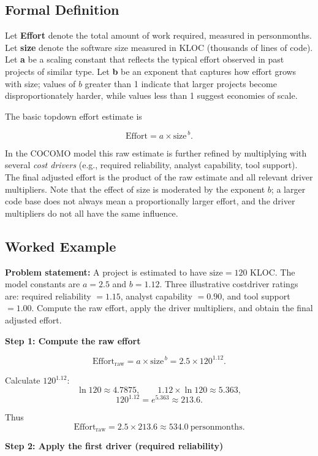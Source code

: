 \documentclass[12pt, a4paper]{article}
\begin{document}
\subsection{Formal Definition}
Let \textbf{Effort} denote the total amount of work required, measured in personmonths.  
Let \textbf{size} denote the software size measured in KLOC (thousands of lines of code).  
Let \textbf{a} be a scaling constant that reflects the typical effort observed in past projects of similar type.  
Let \textbf{b} be an exponent that captures how effort grows with size; values of \(b\) greater than 1 indicate that larger projects become disproportionately harder, while values less than 1 suggest economies of scale.

The basic topdown effort estimate is  

\[
\text{Effort} = a \times \text{size}^{\,b}.
\]

In the COCOMO model this raw estimate is further refined by multiplying with several \emph{cost drivers} (e.g., required reliability, analyst capability, tool support).  The final adjusted effort is the product of the raw estimate and all relevant driver multipliers.  Note that the effect of size is moderated by the exponent \(b\); a larger code base does not always mean a proportionally larger effort, and the driver multipliers do not all have the same influence.

\subsection{Worked Example}
\textbf{Problem statement:}  
A project is estimated to have \(\text{size}=120\) KLOC.  The model constants are \(a=2.5\) and \(b=1.12\).  Three illustrative costdriver ratings are: required reliability \(=1.15\), analyst capability \(=0.90\), and tool support \(=1.00\).  Compute the raw effort, apply the driver multipliers, and obtain the final adjusted effort.  

\textbf{Step 1: Compute the raw effort}  

\[
\text{Effort}_{\text{raw}} = a \times \text{size}^{\,b}
= 2.5 \times 120^{1.12}.
\]

Calculate \(120^{1.12}\):
\[
\ln 120 \approx 4.7875,\qquad
1.12 \times \ln 120 \approx 5.363,
\]
\[
120^{1.12}=e^{5.363}\approx 213.6.
\]

Thus
\[
\text{Effort}_{\text{raw}} = 2.5 \times 213.6 \approx 534.0\ \text{personmonths}.
\]

\textbf{Step 2: Apply the first driver (required reliability)}  
\end{document}
